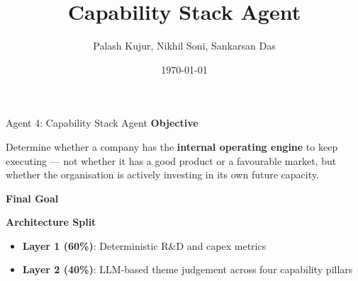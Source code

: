 \documentclass[aspectratio=169]{beamer}
\title{Capability Stack Agent}
\author{Palash Kujur, Nikhil Soni, Sankarsan Das}
\date{\today}
\begin{document}
\begin{frame}
\titlepage
\end{frame}

\begin{frame}{Agent 4: Capability Stack Agent}
\textbf{Objective}
\vspace{0.3cm}

Determine whether a company has the \textbf{internal operating engine} to keep
executing --- not whether it has a good product or a favourable market, but
whether the organisation is actively investing in its own future capacity.

\vspace{0.3cm}
\textbf{Final Goal}
\begin{center}
\end{center}

\vspace{0.2cm}
\textbf{Architecture Split}
\begin{itemize}
    \item \textbf{Layer 1 (60\%)}: Deterministic R\&D and capex metrics
    \item \textbf{Layer 2 (40\%)}: LLM-based theme judgement across four capability pillars
\end{itemize}
\end{frame}
\end{document}
